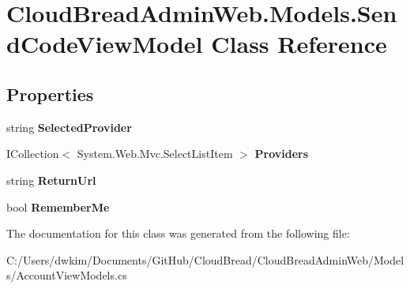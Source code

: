 \hypertarget{a00177}{}\section{Cloud\+Bread\+Admin\+Web.\+Models.\+Send\+Code\+View\+Model Class Reference}
\label{a00177}
\subsection*{Properties}
\begin{DoxyCompactItemize}
\item 
string {\bfseries Selected\+Provider}\hypertarget{a00177_ab0528350f52b5f745afc47ffcfa252f9}{}\label{a00177_ab0528350f52b5f745afc47ffcfa252f9}

\item 
I\+Collection$<$ System.\+Web.\+Mvc.\+Select\+List\+Item $>$ {\bfseries Providers}\hypertarget{a00177_ab27018cdedf43ffbcecf30a252a2a62c}{}\label{a00177_ab27018cdedf43ffbcecf30a252a2a62c}

\item 
string {\bfseries Return\+Url}\hypertarget{a00177_a37e3906c472dcea0abed5ed25c1819bd}{}\label{a00177_a37e3906c472dcea0abed5ed25c1819bd}

\item 
bool {\bfseries Remember\+Me}\hypertarget{a00177_a15ffe12c85ebe53d6ee1a2a832fd5329}{}\label{a00177_a15ffe12c85ebe53d6ee1a2a832fd5329}

\end{DoxyCompactItemize}


The documentation for this class was generated from the following file\+:\begin{DoxyCompactItemize}
\item 
C\+:/\+Users/dwkim/\+Documents/\+Git\+Hub/\+Cloud\+Bread/\+Cloud\+Bread\+Admin\+Web/\+Models/Account\+View\+Models.\+cs\end{DoxyCompactItemize}
